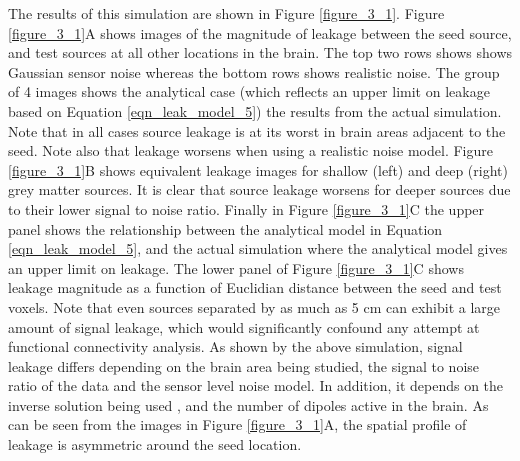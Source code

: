 The results of this simulation are shown in Figure \ref{figure_3_1}. Figure \ref{figure_3_1}A shows images of the magnitude of leakage between the seed source, and test sources at all other locations in the brain. The top two rows shows shows Gaussian sensor noise whereas the bottom rows shows realistic noise. The group of 4 images shows the analytical case (which reflects an upper limit on leakage based on Equation \ref{eqn_leak_model_5}) the results from the actual simulation. Note that in all cases source leakage is at its worst in brain areas adjacent to the seed. Note also that leakage worsens when using a realistic noise model. Figure \ref{figure_3_1}B shows equivalent leakage images for shallow (left) and deep (right) grey matter sources. It is clear that source leakage worsens for deeper sources due to their lower signal to noise ratio. Finally in Figure \ref{figure_3_1}C the upper panel shows the relationship between the analytical model in Equation \ref{eqn_leak_model_5}, and the actual simulation where the analytical model gives an upper limit on leakage. The lower panel of Figure \ref{figure_3_1}C shows leakage magnitude as a function of Euclidian distance between the seed and test voxels. Note that even sources separated by as much as 5 cm can exhibit a large amount of signal leakage, which would significantly confound any attempt at functional connectivity analysis. As shown by the above simulation, signal leakage differs depending on the brain area being studied, the signal to noise ratio of the data and the sensor level noise model. In addition, it depends on the inverse solution being used \citep{Scoffelen2009}, and the number of dipoles active in the brain. As can be seen from the images in Figure \ref{figure_3_1}A, the spatial profile of leakage is asymmetric around the seed location.

